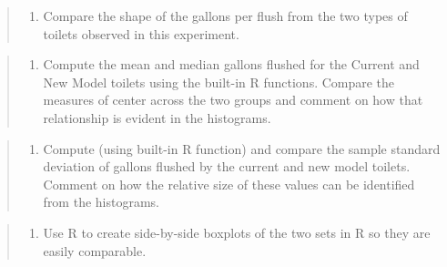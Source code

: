\documentclass[
]{article}
\providecommand{\tightlist}{%
  \setlength{\itemsep}{0pt}\setlength{\parskip}{0pt}}
\begin{document}
\vspace{.5cm}

\begin{quote}
\begin{enumerate}
\def\labelenumi{\alph{enumi}.}
\setcounter{enumi}{1}
\tightlist
\item
  Compare the shape of the gallons per flush from the two types of
  toilets observed in this experiment.
\end{enumerate}
\end{quote}

\vspace{.5cm}

\begin{quote}
\begin{enumerate}
\def\labelenumi{\alph{enumi}.}
\setcounter{enumi}{2}
\tightlist
\item
  Compute the mean and median gallons flushed for the Current and New
  Model toilets using the built-in R functions. Compare the measures of
  center across the two groups and comment on how that relationship is
  evident in the histograms.
\end{enumerate}
\end{quote}

\vspace{.5cm}

\begin{quote}
\begin{enumerate}
\def\labelenumi{\alph{enumi}.}
\setcounter{enumi}{3}
\tightlist
\item
  Compute (using built-in R function) and compare the sample standard
  deviation of gallons flushed by the current and new model toilets.
  Comment on how the relative size of these values can be identified
  from the histograms.
\end{enumerate}
\end{quote}

\vspace{.5cm}

\begin{quote}
\begin{enumerate}
\def\labelenumi{\alph{enumi}.}
\setcounter{enumi}{4}
\tightlist
\item
  Use R to create side-by-side boxplots of the two sets in R so they are
  easily comparable.
\end{enumerate}
\end{quote}

\vspace{.5cm}
\end{document}
